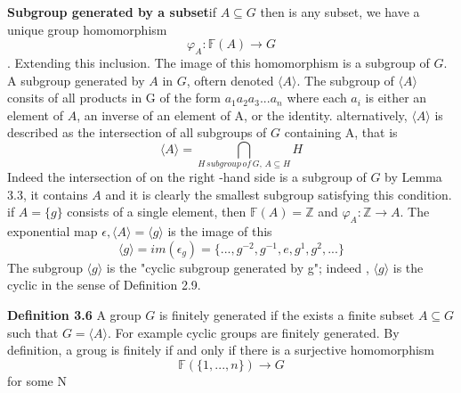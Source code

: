 \textbf{Subgroup generated by a subset}if $A \subseteq G$ then is any  subset, we have a unique group homomorphism
$$\varphi_A : \mathbb{F}(A) \to G$$. Extending this inclusion. The image of this homomorphism is a subgroup of $G$. A subgroup generated by $A$ in $G$, oftern denoted $\langle A \rangle$. The subgroup of $\langle A \rangle$ consits of all products in G of the form $a_1a_2a_3...a_n$ where each $a_i$ is either an element of $A$, an inverse of an element of A, or the identity. alternatively, $\langle A \rangle$ is described as the intersection of all subgroups of $G$ containing A, that is
$$\langle A \rangle = \bigcap_{H \, subgroup \, of \, G, \, A \subseteq H} H$$ Indeed the intersection of on the right -hand side is a subgroup of $G$ by Lemma 3.3, it contains $A$ and it is clearly the smallest subgroup satisfying this condition.
if $A = \{g\}$ consists of a single element, then $\mathbb{F}(A) = \mathbb{Z}$ and $\varphi_A : \mathbb{Z} \to A$. The exponential map $\epsilon, \langle A \rangle = \langle g \rangle$ is the image of this
$$\langle g \rangle = im(\epsilon_g) = \{..., g^{-2},g^{-1},e,g^{1},g^{2},...\}$$
The subgroup $\langle g \rangle$ is the "cyclic subgroup generated by g"; indeed , $\langle g \rangle$ is the cyclic in the sense of Definition 2.9.

\textbf{Definition 3.6} A group $G$ is finitely generated if the exists a finite subset $A \subseteq G$ such that  $G = \langle A \rangle $. For example cyclic groups are finitely generated.
By definition, a groug is finitely if and only if there is a surjective homomorphism
$$\mathbb{F}(\{1,...,n\}) \to G$$ for some N

